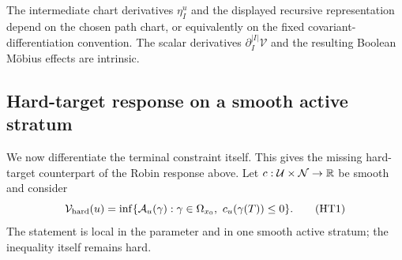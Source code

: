 The intermediate chart derivatives \(\eta_I^u\) and the displayed recursive
representation depend on the chosen path chart, or equivalently on the fixed
covariant-differentiation convention.  The scalar derivatives
\(\partial_I^{|I|}\mathcal V\) and the resulting Boolean M\"obius effects are
intrinsic.

\subsection{Hard-target response on a smooth active stratum}

We now differentiate the terminal constraint itself.  This gives the missing
hard-target counterpart of the Robin response above.  Let
\(c:\mathcal U\times\mathcal N\to\mathbb R\) be smooth and consider
\begin{equation}
  \mathcal V_{\rm hard}(u)
  =\inf\{\mathcal A_u(\gamma):
  \gamma\in\Omega_{x_0},\ c_u(\gamma(T))\le0\}.
  \tag{HT1}
\end{equation}
The statement is local in the parameter and in one smooth active stratum;
the inequality itself remains hard.


